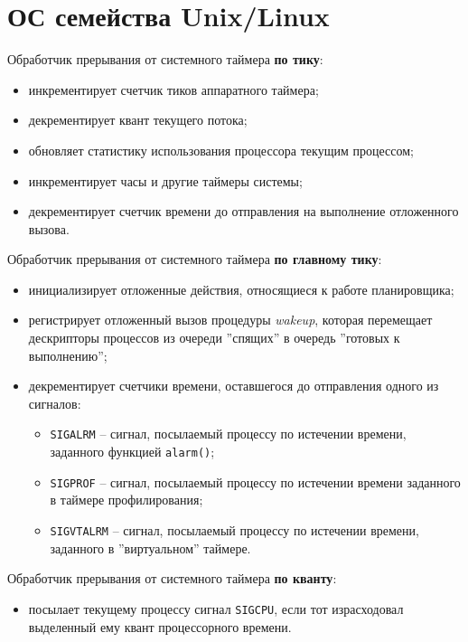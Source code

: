 \section{ОС семейства Unix/Linux}

Обработчик прерывания от системного таймера \textbf{по тику}:
\begin{itemize}[left=\parindent]
    \item инкрементирует счетчик тиков аппаратного таймера;
    \item декрементирует квант текущего потока;
    \item обновляет статистику использования процессора текущим процессом;
    \item инкрементирует часы и другие таймеры системы; 
    \item декрементирует счетчик времени до отправления на выполнение
          отложенного вызова.
\end{itemize}

Обработчик прерывания от системного таймера \textbf{по главному тику}:
\begin{itemize}[left=\parindent]
    \item инициализирует отложенные действия, относящиеся к работе планировщика;
    \item регистрирует отложенный вызов процедуры \textit{wakeup}, которая
          перемещает дескрипторы процессов из очереди ''спящих'' в очередь
          ''готовых к выполнению'';
    \item декрементирует счетчики времени, оставшегося до отправления одного из
          сигналов:
    \begin{itemize}[left=\parindent]
        \item \texttt{SIGALRM} -- сигнал, посылаемый процессу по истечении
              времени, заданного функцией \texttt{alarm()};
        \item \texttt{SIGPROF} -- сигнал, посылаемый процессу по истечении
              времени заданного в таймере профилирования;
        \item \texttt{SIGVTALRM} -- сигнал, посылаемый процессу по истечении
              времени, заданного в ''виртуальном'' таймере.
    \end{itemize}
\end{itemize}

Обработчик прерывания от системного таймера \textbf{по кванту}:
\begin{itemize}[left=\parindent]
    \item посылает текущему процессу сигнал \texttt{SIGCPU}, если тот
          израсходовал выделенный ему квант процессорного времени. 
\end{itemize}

